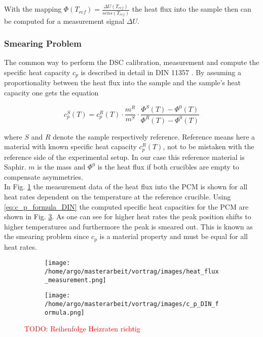 \documentclass{scrartcl}[12pt, halfparskip]
\newcommand{\todo}[1]{\textcolor{red}{TODO: #1}}
\begin{document}
With the mapping $\Phi(T_{ref}) = \frac{\Delta U(T_{ref})}{sens(T_{ref})}$ the heat flux into the sample then can be computed for a measurement signal $\Delta U$. 




\subsubsection{Smearing Problem}
The common way to perform the DSC calibration, measurement and compute the specific heat capacity $c_p$ is described in detail in DIN 11357 \cite{DIN_11357}. By assuming a proportionality between the heat flux into the sample and the sample's heat capacity one gets the equation

\begin{equation}
	c_p^S(T) = c_p^{R}(T) \cdot \frac{m^R}{m^S} \cdot \frac{\Phi^S(T) - \Phi^0(T)}{\Phi^R(T) - \Phi^0(T)}
	\label{eq:c_p_formula_DIN}
\end{equation}

where $S$ and $R$ denote the sample respectively reference. Reference means here a material with known specific heat capacity $c_p^R(T)$, not to be mistaken with the reference side of the experimental setup. In our case this reference material is Saphir. $m$ is the mass and $\Phi^0$ is the heat flux if both crucibles are empty to compensate asymmetries. \\
In Fig. \ref{fig:heat_flux_measurements} the measurement data of the heat flux into the PCM is shown for all heat rates dependent on the temperature at the reference crucible. Using \eqref{eq:c_p_formula_DIN} the computed specific heat capacities for the PCM are shown in Fig. \ref{fig:c_p_DIN_formula}. As one can see for higher heat rates the peak position shifts to higher temperatures and furthermore the peak is smeared out. This is known as the smearing problem since $c_p$ is a material property and must be equal for all heat rates.


\begin{figure}[H]
	\begin{subfigure}{0.49\textwidth}
		\texttt{[image: /home/argo/masterarbeit/vortrag/images/heat\_flux\_measurement.png]}
		\caption{}
		\label{fig:heat_flux_measurements}
	\end{subfigure}
	\begin{subfigure}{0.49\textwidth}
		\texttt{[image: /home/argo/masterarbeit/vortrag/images/c\_p\_DIN\_formula.png]}
		\caption{}
		\label{fig:c_p_DIN_formula}
	\end{subfigure}
	\caption{\todo{Reihenfolge Heizraten richtig}}
\end{figure}
\end{document}

